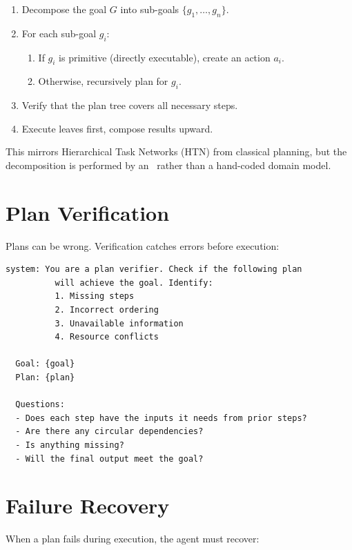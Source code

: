 \begin{algorithm}
	\begin{enumerate}
		\item Decompose the goal $G$ into sub-goals $\{g_1, \dots, g_n\}$.
		\item For each sub-goal $g_i$:
		      \begin{enumerate}
			      \item If $g_i$ is primitive (directly executable), create an action $a_i$.
			      \item Otherwise, recursively plan for $g_i$.
		      \end{enumerate}
		\item Verify that the plan tree covers all necessary steps.
		\item Execute leaves first, compose results upward.
	\end{enumerate}
\end{algorithm}

This mirrors Hierarchical Task Networks (HTN) from classical planning, but the decomposition is performed by an \llm\ rather than a hand-coded domain model.

\section{Plan Verification}

Plans can be wrong. Verification catches errors before execution:

\begin{lstlisting}[caption=Plan verification prompt]
  system: You are a plan verifier. Check if the following plan
          will achieve the goal. Identify:
          1. Missing steps
          2. Incorrect ordering
          3. Unavailable information
          4. Resource conflicts

  Goal: {goal}
  Plan: {plan}

  Questions:
  - Does each step have the inputs it needs from prior steps?
  - Are there any circular dependencies?
  - Is anything missing?
  - Will the final output meet the goal?
\end{lstlisting}

\section{Failure Recovery}

When a plan fails during execution, the agent must recover:

